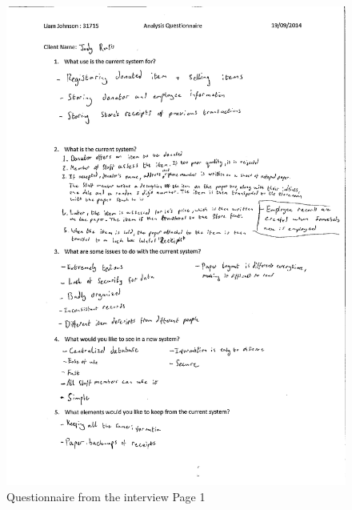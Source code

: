 \begin{figure}[H]
    \includegraphics[width=\textwidth]{./Analysis/Appendix1.pdf}
    \caption{Questionnaire from the interview Page 1} \label{fig:SectionAppendix}
\end{figure}

